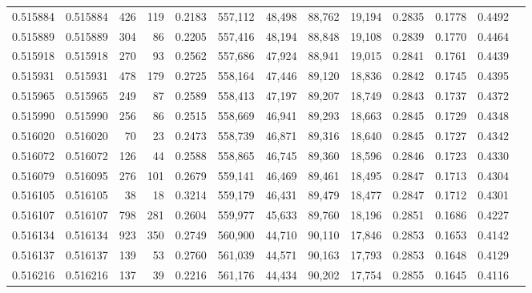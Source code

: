 \begin{tabular}{rrrrrrrrrrrrr}
0.515884 & 0.515884 &   426 &   119 &                                     0.2183 & 557,112 &  48,498 &  88,762 &  19,194 & 0.2835 & 0.1778 & 0.4492 \\
0.515889 & 0.515889 &   304 &    86 &                                     0.2205 & 557,416 &  48,194 &  88,848 &  19,108 & 0.2839 & 0.1770 & 0.4464 \\
0.515918 & 0.515918 &   270 &    93 &                                     0.2562 & 557,686 &  47,924 &  88,941 &  19,015 & 0.2841 & 0.1761 & 0.4439 \\
0.515931 & 0.515931 &   478 &   179 &                                     0.2725 & 558,164 &  47,446 &  89,120 &  18,836 & 0.2842 & 0.1745 & 0.4395 \\
0.515965 & 0.515965 &   249 &    87 &                                     0.2589 & 558,413 &  47,197 &  89,207 &  18,749 & 0.2843 & 0.1737 & 0.4372 \\
0.515990 & 0.515990 &   256 &    86 &                                     0.2515 & 558,669 &  46,941 &  89,293 &  18,663 & 0.2845 & 0.1729 & 0.4348 \\
0.516020 & 0.516020 &    70 &    23 &                                     0.2473 & 558,739 &  46,871 &  89,316 &  18,640 & 0.2845 & 0.1727 & 0.4342 \\
0.516072 & 0.516072 &   126 &    44 &                                     0.2588 & 558,865 &  46,745 &  89,360 &  18,596 & 0.2846 & 0.1723 & 0.4330 \\
0.516079 & 0.516095 &   276 &   101 &                                     0.2679 & 559,141 &  46,469 &  89,461 &  18,495 & 0.2847 & 0.1713 & 0.4304 \\
0.516105 & 0.516105 &    38 &    18 &                                     0.3214 & 559,179 &  46,431 &  89,479 &  18,477 & 0.2847 & 0.1712 & 0.4301 \\
0.516107 & 0.516107 &   798 &   281 &                                     0.2604 & 559,977 &  45,633 &  89,760 &  18,196 & 0.2851 & 0.1686 & 0.4227 \\
0.516134 & 0.516134 &   923 &   350 &                                     0.2749 & 560,900 &  44,710 &  90,110 &  17,846 & 0.2853 & 0.1653 & 0.4142 \\
0.516137 & 0.516137 &   139 &    53 &                                     0.2760 & 561,039 &  44,571 &  90,163 &  17,793 & 0.2853 & 0.1648 & 0.4129 \\
0.516216 & 0.516216 &   137 &    39 &                                     0.2216 & 561,176 &  44,434 &  90,202 &  17,754 & 0.2855 & 0.1645 & 0.4116 \\

\end{tabular}
